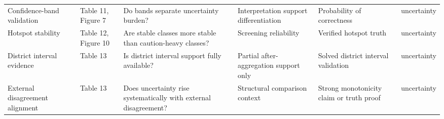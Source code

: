 \begin{longtable}{L{0.15\textwidth}L{0.15\textwidth}L{0.18\textwidth}L{0.18\textwidth}L{0.18\textwidth}L{0.10\textwidth}}
Confidence-band validation & Table 11, Figure 7 & Do bands separate uncertainty burden? & Interpretation support differentiation & Probability of correctness & uncertainty \\
Hotspot stability & Table 12, Figure 10 & Are stable classes more stable than caution-heavy classes? & Screening reliability & Verified hotspot truth & uncertainty \\
District interval evidence & Table 13 & Is district interval support fully available? & Partial after-aggregation support only & Solved district interval validation & uncertainty \\
External disagreement alignment & Table 13 & Does uncertainty rise systematically with external disagreement? & Structural comparison context & Strong monotonicity claim or truth proof & uncertainty \\
\bottomrule
\end{longtable}
\endgroup

